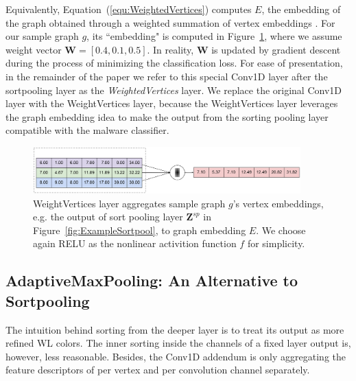 Equivalently, Equation~(\ref{equ:WeightedVertices}) computes $E$, the embedding of the graph obtained through a weighted summation of vertex embeddings \cite{GraphEmbedding}.
For our sample graph $g$, its ``embedding" is computed in Figure~\ref{fig:ExampleWeightedVertice}, where we assume weight vector $\mathbf{W}=[0.4, 0.1, 0.5]$.
In reality, $\mathbf{W}$ is updated by gradient descent during the process of minimizing the classification loss.
For ease of presentation, in the remainder of the paper we refer to this special Conv1D layer after the sortpooling layer as the \textit{WeightedVertices} layer.
We replace the original Conv1D layer with the WeightVertices layer, because the WeightVertices layer leverages the graph embedding idea to make the output from the sorting pooling layer compatible with the malware classifier.


\begin{figure}[htbp]
\centerline{\includegraphics[width=0.92\textwidth]{Magic/figures/ExampleWeightedVertice.eps}}
\caption{WeightVertices layer aggregates sample graph $g$'s vertex embeddings,
e.g. the output of sort pooling layer $\mathbf{Z}^{sp}$ in Figure~\ref{fig:ExampleSortpool}, to graph embedding $E$. We choose again RELU as the nonlinear activition function $f$ for simplicity.}
\label{fig:ExampleWeightedVertice}
\end{figure}

\subsection{AdaptiveMaxPooling: An Alternative to Sortpooling}
The intuition behind sorting from the deeper layer is to treat its output as more refined WL colors\cite{WlAlgorithm, WlGraphKernel}.
The inner sorting inside the channels of a fixed layer output is, however, less reasonable.
Besides, the Conv1D addendum is only aggregating the feature descriptors of per vertex and per convolution channel separately.

